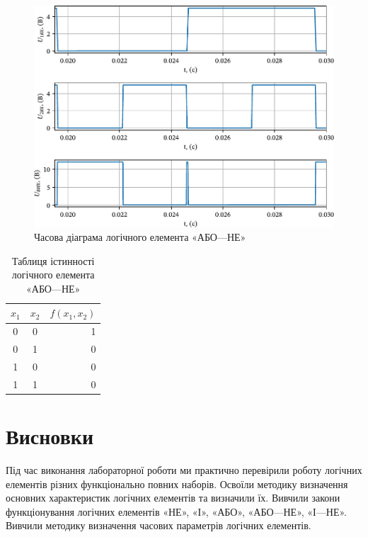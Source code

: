 \documentclass[a4paper,oneside,DIV=10,12pt]{scrartcl}
\begin{document}
			\begin{figure}[!htbp]
			\centering
				\includegraphics[width=\textwidth]{plots/03-pdf/05-NOR-time-diagram-edited.pdf}
			\caption{Часова діаграма логічного елемента «АБО—НЕ»}
			\label{fig:NOR-time-diagram}
			\end{figure}
			
			\begin{table}[!htbp]
			\centering
				\begin{tabular}{ccr}
					\toprule
						$x_1$ & $x_2$ & $f(x_1, x_2)$\\
					\midrule
						0     & 0     & 1\\
						0     & 1     & 0\\
						1     & 0     & 0\\
						1     & 1     & 0\\
					\bottomrule
				\end{tabular}
			\caption{Таблиця істинності логічного елемента «АБО—НЕ»}
			\label{fig:NOR-truth-table}
			\end{table}
			
	\section{Висновки}
		Під час виконання лабораторної роботи ми практично перевірили роботу логічних елементів різних функціонально повних наборів. Освоїли методику визначення основних характеристик логічних елементів та визначили їх. Вивчили закони функціонування логічних елементів «НЕ», «І», «АБО», «АБО—НЕ», «І—НЕ». Вивчили методику визначення часових параметрів логічних елементів.
		
\end{document}

